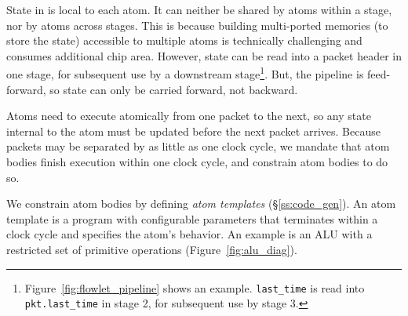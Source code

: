  State in \absmachine is local to each atom.  It can
neither be shared by atoms within a stage, nor by atoms across stages. This is
because building multi-ported memories (to store the state) accessible to
multiple atoms is technically challenging and consumes additional chip area.
However, state can be read into a packet header in one stage, for subsequent
use by a downstream stage\footnote{Figure~\ref{fig:flowlet_pipeline} shows an
example. {\tt last\_time} is read into {\tt pkt.last\_time} in stage 2, for
subsequent use by stage 3.}.  But, the \absmachine pipeline is feed-forward, so
state can only be carried forward, not backward.

 Atoms need to execute atomically from one packet
to the next, so any state internal to the atom must be updated before the next
packet arrives.  Because packets may be separated by as little as one clock
cycle, we mandate that atom bodies finish execution within one clock cycle, and
constrain atom bodies to do so.

We constrain atom bodies by defining {\it atom templates}
(\S\ref{ss:code_gen}).  An atom template is a program with configurable
parameters that terminates within a clock cycle and specifies the atom's
behavior.  An example is an ALU with a restricted set of primitive operations
(Figure~\ref{fig:alu_diag}).



